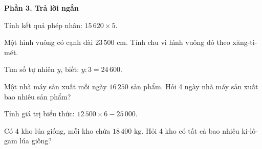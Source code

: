 \textbf{Phần 3. Trả lời ngắn}

\begin{ex} %
Tính kết quả phép nhân: $15\,620 \times 5$.
\end{ex}

\begin{ex} %
Một hình vuông có cạnh dài $23\,500\text{ cm}$. Tính chu vi hình vuông đó theo xăng-ti-mét.
\end{ex}

\begin{ex} %
Tìm số tự nhiên $y$, biết: $y : 3 = 24\,600$.
\end{ex}

\begin{ex} %
Một nhà máy sản xuất mỗi ngày $16\,250$ sản phẩm. Hỏi 4 ngày nhà máy sản xuất bao nhiêu sản phẩm?
\end{ex}

\begin{ex} %
Tính giá trị biểu thức: $12\,500 \times 6 - 25\,000$.
\end{ex}

\begin{ex} %
Có 4 kho lúa giống, mỗi kho chứa $18\,400\text{ kg}$. Hỏi 4 kho có tất cả bao nhiêu ki-lô-gam lúa giống?
\end{ex}
